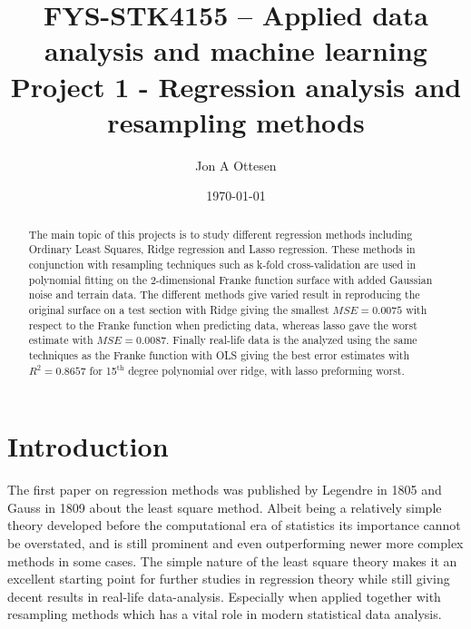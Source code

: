 \documentclass[uio,jmp,amsmath,amssymb,reprint,nofootinbib]{revtex4-1}
\numberwithin{equation}{section}
\begin{document}
\title{FYS-STK4155 – Applied data analysis and machine learning\\ Project 1 - Regression analysis and resampling methods}%

\author{Jon A Ottesen}
\date{\today}

\begin{abstract}
The main topic of this projects is to study different regression methods including Ordinary Least Squares, Ridge regression and Lasso regression. These methods in conjunction with resampling techniques such as k-fold cross-validation are used in polynomial fitting on the 2-dimensional Franke function surface with added Gaussian noise and terrain data. The different methods give varied result in reproducing the original surface on a test section with Ridge giving the smallest \(MSE = 0.0075\) with respect to the Franke function when predicting data, whereas lasso gave the worst estimate with \(MSE = 0.0087\). Finally real-life data is the analyzed using the same techniques as the Franke function with OLS giving the best error estimates with \(R^2 = 0.8657\) for 15\(^\text{th}\) degree polynomial over ridge, with lasso preforming worst.

\end{abstract}

\maketitle


\section{Introduction}\label{sec:Introduction}

The first paper on regression methods was published by Legendre in 1805 and Gauss in 1809 about the least square method\cite{wiki:Regression_analysis}. Albeit being a relatively simple theory developed before the computational era of statistics its importance cannot be overstated, and is still prominent and even outperforming newer more complex methods in some cases. The simple nature of the least square theory makes it an excellent starting point for further studies in regression theory while still giving decent results in real-life data-analysis. Especially when applied together with resampling methods which has a vital role in modern statistical data analysis.
\end{document}
